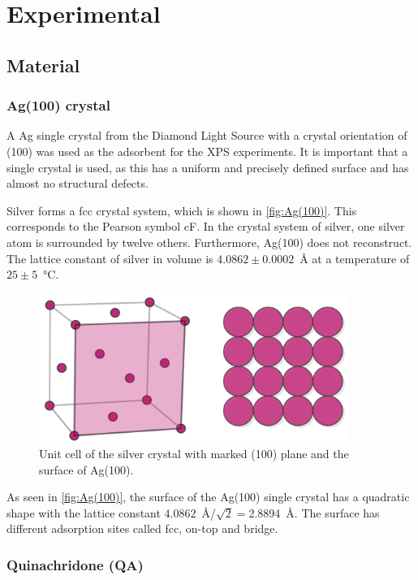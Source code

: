 \chapter{Experimental}
\section{Material}

\subsection{Ag(100) crystal}
A \acf{Ag} single crystal from the Diamond Light Source with a crystal orientation of (100) was used as the adsorbent for the \ac{XPS} experiments. It is important that a single crystal is used, as this has a uniform and precisely defined surface and has almost no structural defects.

Silver forms a \ac{fcc} crystal system, which is shown in \autoref{fig:Ag(100)}. This corresponds to the Pearson symbol cF. In the crystal system of silver, one silver atom is surrounded by twelve others. Furthermore, Ag(100) does not reconstruct. The lattice constant of silver in volume is $4.0862\pm0.0002$~\si{\angstrom} at a temperature of $25\pm5$~\si{\celsius}\autocite{Mueller2006,Weast1974}.

\begin{figure}[H]
	\centering
	\includegraphics[width=0.9\textwidth]{images/Ag(100).pdf}
	\caption{Unit cell of the silver crystal with marked (100) plane and the surface of Ag(100).}
	\label{fig:Ag(100)}
\end{figure}

As seen in \autoref{fig:Ag(100)}, the surface of the Ag(100) single crystal has a quadratic shape with the lattice constant $4.0862$~\si{\angstrom}/$\sqrt{2}=$2.8894~\si{\angstrom}. The surface has different adsorption sites called fcc, on-top and bridge.

\newpage
\subsection{Quinachridone (QA)}


